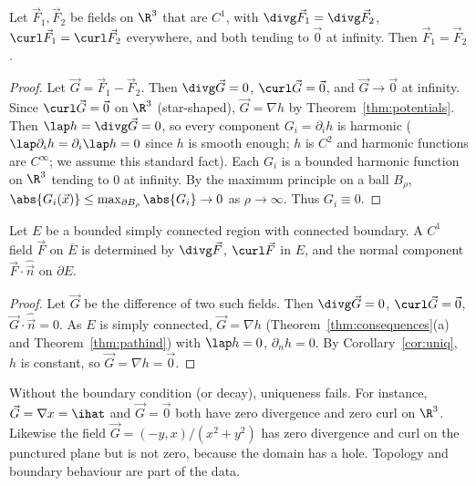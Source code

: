 \begin{theorem}[Uniqueness]\label{thm:helmuniq}
Let $\vec F_1,\vec F_2$ be fields on $\R^3$ that are $C^1$, with $\divg\vec F_1=\divg\vec F_2$, $\curl\vec F_1=\curl\vec F_2$ everywhere, and both tending to $\vec0$ at infinity. Then $\vec F_1=\vec F_2$.
\end{theorem}

\begin{proof}
Let $\vec G=\vec F_1-\vec F_2$. Then $\divg\vec G=0$, $\curl\vec G=\vec0$, and $\vec G\to\vec0$ at infinity. Since $\curl\vec G=\vec0$ on $\R^3$ (star-shaped), $\vec G=\nabla h$ by Theorem~\ref{thm:potentials}. Then $\lap h=\divg\vec G=0$, so every component $G_i=\partial_ih$ is harmonic ($\lap\partial_ih=\partial_i\lap h=0$ since $h$ is smooth enough; $h$ is $C^2$ and harmonic functions are $C^\infty$; we assume this standard fact). Each $G_i$ is a bounded harmonic function on $\R^3$ tending to $0$ at infinity. By the maximum principle on a ball $B_\rho$, $\abs{G_i(\vec x)}\le\max_{\partial B_\rho}\abs{G_i}\to0$ as $\rho\to\infty$. Thus $G_i\equiv0$.
\end{proof}

\begin{theorem}\label{thm:helmbounded}
Let $E$ be a bounded simply connected region with connected boundary. A $C^1$ field $\vec F$ on $\overline E$ is determined by $\divg\vec F$, $\curl\vec F$ in $E$, and the normal component $\vec F\cdot\hat{\vec n}$ on $\partial E$.
\end{theorem}

\begin{proof}
Let $\vec G$ be the difference of two such fields. Then $\divg\vec G=0$, $\curl\vec G=\vec0$, $\vec G\cdot\hat{\vec n}=0$. As $E$ is simply connected, $\vec G=\nabla h$ (Theorem~\ref{thm:consequences}(a) and Theorem~\ref{thm:pathind}) with $\lap h=0$, $\partial_nh=0$. By Corollary~\ref{cor:uniq}, $h$ is constant, so $\vec G=\nabla h=\vec0$.
\end{proof}

\begin{pitfall}
Without the boundary condition (or decay), uniqueness fails. For instance, $\vec G=\nabla x=\ihat$ and $\vec G=\vec0$ both have zero divergence and zero curl on $\R^3$. Likewise the field $\vec G=(-y,x)/(x^2+y^2)$ has zero divergence and curl on the punctured plane but is not zero, because the domain has a hole. Topology and boundary behaviour are part of the data.
\end{pitfall}

